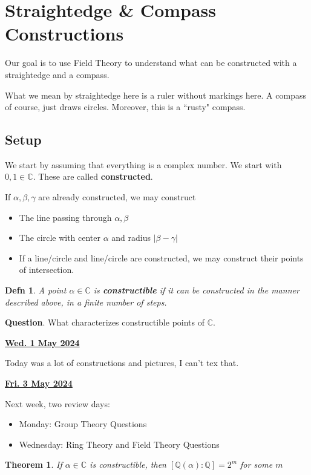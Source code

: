 \documentclass[12pt]{article}
\renewcommand{\date}[1]{\underline{\bf #1}}
\def\Q{{\mathbb Q}}
\def\C{{\mathbb C}}
\newtheorem{theorem}{Theorem}
\newtheorem{definition}{Defn}
\theoremstyle{remark}
\theoremstyle{remark}
\theoremstyle{remark}
\theoremstyle{remark}
\theoremstyle{remark}
\begin{document}
\section{Straightedge \& Compass Constructions}

Our goal is to use Field Theory to understand what can be constructed with a
straightedge and a compass.

What we mean by straightedge here is a ruler without markings here. A compass of
course, just draws circles. Moreover, this is a ``rusty" compass.

\subsection{Setup}

We start by assuming that everything is a complex number. We start with $0, 1
\in \C$. These are called {\bf constructed}.

If $\alpha, \beta, \gamma$ are already constructed, we may construct
\begin{itemize}
  \item The line passing through $\alpha, \beta$
  \item The circle with center $\alpha$ and radius $|\beta - \gamma|$
  \item If a line/circle and line/circle are constructed, we may construct their
    points of intersection.
\end{itemize}

\begin{definition}
  A point $\alpha \in \C$ is {\bf constructible} if it can be constructed in the
  manner described above, in a finite number of steps.
\end{definition}

{\bf Question}. What characterizes constructible points of $\C$.

\date{Wed. 1 May 2024}

Today was a lot of constructions and pictures, I can't tex that.

\date{Fri. 3 May 2024}

Next week, two review days:
\begin{itemize}
  \item Monday: Group Theory Questions
  \item Wednesday: Ring Theory and Field Theory Questions
\end{itemize}

\begin{theorem}
  If $\alpha \in \C$ is constructible, then $[\Q(\alpha) : \Q] = 2^m$ for some
  $m$
\end{theorem}
\end{document}
